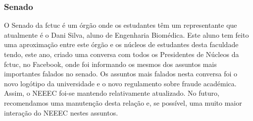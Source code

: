 
\subsubsection{Senado}

O Senado da \acrshort{fctuc} é um órgão onde os estudantes têm um representante que atualmente é o Dani Silva, aluno de Engenharia Biomédica. Este aluno tem feito uma aproximação entre este órgão e os núcleos de estudantes desta faculdade tendo, este ano, criado uma conversa com todos os Presidentes de Núcleos da \acrshort{fctuc}, no Facebook, onde foi informando os mesmos dos assuntos mais importantes falados no senado. Os assuntos mais falados nesta conversa foi o novo logótipo da universidade e o novo regulamento sobre fraude académica. Assim, o NEEEC foi-se mantendo relativamente atualizado. No futuro, recomendamos uma manutenção desta relação e, se possível, uma muito maior interação do NEEEC nestes assuntos.